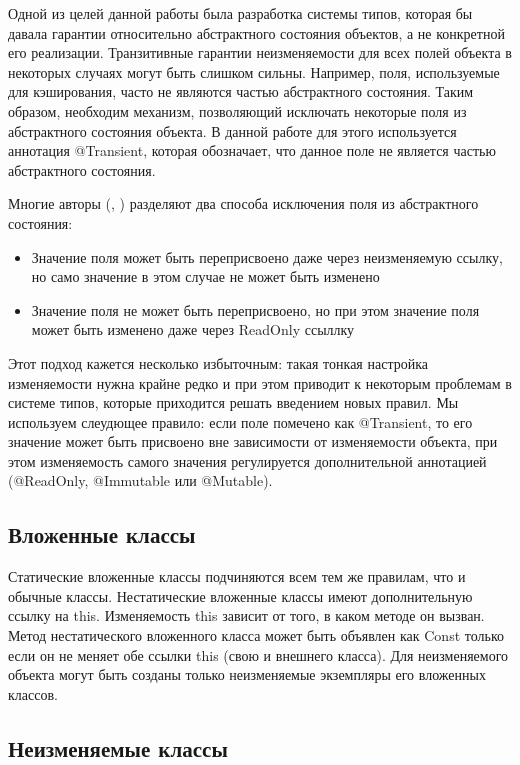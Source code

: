 Одной из целей данной работы была разработка системы типов, которая бы давала гарантии относительно абстрактного состояния объектов, а не конкретной его реализации. Транзитивные гарантии неизменяемости для всех полей объекта в некоторых случаях могут быть слишком сильны. Например, поля, используемые для кэширования, часто не являются частью абстрактного состояния. Таким образом, необходим механизм, позволяющий исключать некоторые поля из абстрактного состояния объекта. В данной работе для этого используется аннотация @Transient, которая обозначает, что данное поле не является частью абстрактного состояния. 

Многие авторы (\cite{Zibin2007}, \cite{Tschantz2006}) разделяют два способа исключения поля из абстрактного состояния:
\begin{itemize}
\item{Значение поля может быть переприсвоено даже через неизменяемую ссылку, но само значение в этом случае не может быть изменено}
\item{Значение поля не может быть переприсвоено, но при этом значение поля может быть изменено даже через ReadOnly ссыллку}
\end{itemize}
Этот подход кажется несколько избыточным: такая тонкая настройка изменяемости нужна крайне редко и при этом приводит к некоторым проблемам в системе типов, которые приходится решать введением новых правил. Мы используем слеудющее правило: если поле помечено как @Transient, то его значение может быть присвоено вне зависимости от изменяемости объекта, при этом изменяемость самого значения регулируется дополнительной аннотацией (@ReadOnly, @Immutable или @Mutable).

\subsection{Вложенные классы}

Статические вложенные классы подчиняются всем тем же правилам, что и обычные классы. Нестатические вложенные классы имеют дополнительную ссылку на this. Изменяемость this зависит от того, в каком методе он вызван. Метод нестатического вложенного класса может быть объявлен как Const только если он не меняет обе ссылки this (свою и внешнего класса). Для неизменяемого объекта могут быть созданы только неизменяемые экземпляры его вложенных классов. 

\subsection{Неизменяемые классы}

